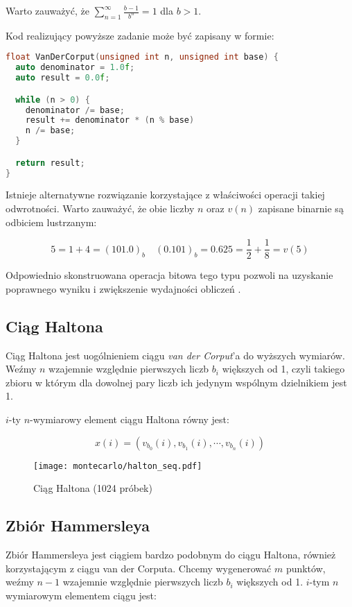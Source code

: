 \documentclass[../main.tex]{subfiles}
\begin{document}
Warto zauważyć, że $\sum_{n=1}^{\infty} \frac{b-1}{b^n} = 1$ dla $b>1$.

Kod realizujący powyższe zadanie może być zapisany w formie:

\begin{lstlisting}[language=c++]
float VanDerCorput(unsigned int n, unsigned int base) {
  auto denominator = 1.0f;
  auto result = 0.0f;

  while (n > 0) {
    denominator /= base;
    result += denominator * (n % base)
    n /= base;
  }

  return result;
}
\end{lstlisting}

Istnieje alternatywne rozwiązanie korzystające z właściwości operacji takiej
odwrotności. Warto zauważyć, że obie liczby $n$ oraz $v(n)$ zapisane binarnie
są odbiciem lustrzanym:

\[
  5 = 1 + 4 = (101.0)_{b} \quad
  (0.101)_{b} = 0.625 = \frac{1}{2} + \frac{1}{8} = v(5)
\]

Odpowiednio skonstruowana operacja bitowa tego typu pozwoli na uzyskanie
poprawnego wyniku i zwiększenie wydajności obliczeń \cite{dammertz_2012}.

\subsection{Ciąg Haltona}

Ciąg Haltona jest uogólnieniem ciągu \textit{van der Corput}'a do wyższych
wymiarów. Weźmy $n$ wzajemnie względnie pierwszych liczb $b_i$ większych od 1,
czyli takiego zbioru w którym dla dowolnej pary liczb ich jedynym wspólnym
dzielnikiem jest 1.

$i$-ty $n$-wymiarowy element ciągu Haltona równy jest:

\[ x(i) = \left( v_{b_0}(i), v_{b_1}(i), \cdots, v_{b_n}(i) \right) \]

\begin{figure}[h]
  \centering
  \texttt{[image: montecarlo/halton\_seq.pdf]}
  \caption{Ciąg Haltona (1024 próbek)}
  \label{fig:HaltonSamples}
\end{figure}

\subsection{Zbiór Hammersleya}

Zbiór Hammersleya jest ciągiem bardzo podobnym do ciągu Haltona, również
korzystającym z ciągu van der Corputa. Chcemy wygenerować $m$ punktów, weźmy
$n-1$ wzajemnie względnie pierwszych liczb $b_i$ większych od 1. $i$-tym $n$
wymiarowym elementem ciągu jest:
\end{document}
